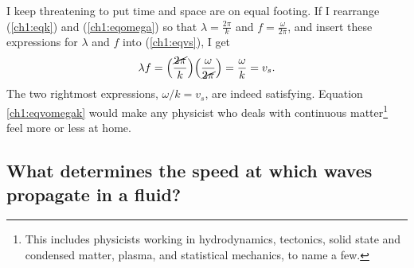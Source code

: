 

I keep threatening to put time and space are on equal footing. If I rearrange
(\ref{ch1:eqk}) and (\ref{ch1:eqomega}) so that $\lambda = \frac{2 \pi}{k}$ and
$f = \frac{\omega}{2 \pi}$, and insert these expressions for $\lambda$ and $f$
into (\ref{ch1:eqvs}), I get
\begin{equation}
  \label{ch1:eqvomegak}
  \lambda f = \Big ( \dfrac{\cancel{2 \pi}}{k} \Big ) \Big ( \dfrac{\omega}{\cancel{2 \pi}} \Big ) = \dfrac{\omega}{k} = v_s.
\end{equation}
The two rightmost expressions, $\omega / k = v_s$, are indeed
satisfying. Equation \ref{ch1:eqvomegak} would make any physicist who deals with
continuous matter\footnote{This includes physicists working in hydrodynamics,
  tectonics, solid state and condensed matter, plasma, and statistical
  mechanics, to name a few.} feel more or less at home.

\subsection{What determines the speed at which waves propagate in a fluid?}
\label{subsec:wavspeed}


